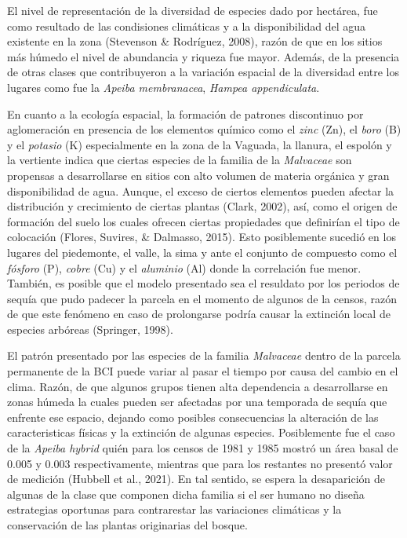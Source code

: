 \documentclass[11pt,]{article}
\begin{document}
El nivel de representación de la diversidad de especies dado por
hectárea, fue como resultado de las condisiones climáticas y a la
disponibilidad del agua existente en la zona (Stevenson \& Rodríguez,
2008), razón de que en los sitios más húmedo el nivel de abundancia y
riqueza fue mayor. Además, de la presencia de otras clases que
contribuyeron a la variación espacial de la diversidad entre los lugares
como fue la \emph{Apeiba membranacea}, \emph{Hampea appendiculata}.

En cuanto a la ecología espacial, la formación de patrones discontinuo
por aglomeración en presencia de los elementos químico como el
\emph{zinc} (Zn), el \emph{boro} (B) y el \emph{potasio} (K)
especialmente en la zona de la Vaguada, la llanura, el espolón y la
vertiente indica que ciertas especies de la familia de la
\emph{Malvaceae} son propensas a desarrollarse en sitios con alto
volumen de materia orgánica y gran disponibilidad de agua. Aunque, el
exceso de ciertos elementos pueden afectar la distribución y crecimiento
de ciertas plantas (Clark, 2002), así, como el origen de formación del
suelo los cuales ofrecen ciertas propiedades que definirían el tipo de
colocación (Flores, Suvires, \& Dalmasso, 2015). Esto posiblemente
sucedió en los lugares del piedemonte, el valle, la sima y ante el
conjunto de compuesto como el \emph{fósforo} (P), \emph{cobre} (Cu) y el
\emph{aluminio} (Al) donde la correlación fue menor. También, es posible
que el modelo presentado sea el resuldato por los periodos de sequía que
pudo padecer la parcela en el momento de algunos de la censos, razón de
que este fenómeno en caso de prolongarse podría causar la extinción
local de especies arbóreas (Springer, 1998).

El patrón presentado por las especies de la familia \emph{Malvaceae}
dentro de la parcela permanente de la BCI puede variar al pasar el
tiempo por causa del cambio en el clima. Razón, de que algunos grupos
tienen alta dependencia a desarrollarse en zonas húmeda la cuales pueden
ser afectadas por una temporada de sequía que enfrente ese espacio,
dejando como posibles consecuencias la alteración de las caracteristicas
físicas y la extinción de algunas especies. Posiblemente fue el caso de
la \emph{Apeiba hybrid} quién para los censos de 1981 y 1985 mostró un
área basal de 0.005 y 0.003 respectivamente, mientras que para los
restantes no presentó valor de medición (Hubbell et al., 2021). En tal
sentido, se espera la desaparición de algunas de la clase que componen
dicha familia si el ser humano no diseña estrategias oportunas para
contrarestar las variaciones climáticas y la conservación de las plantas
originarias del bosque.
\end{document}
